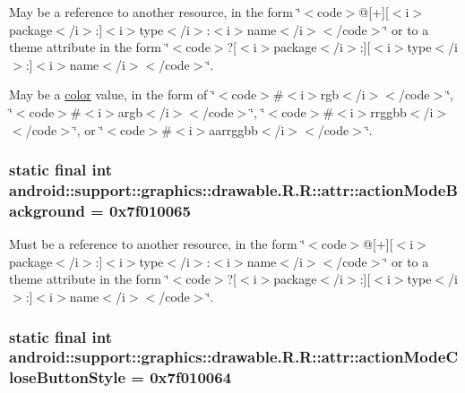 May be a reference to another resource, in the form \char`\"{}$<$code$>$@\mbox{[}+\mbox{]}\mbox{[}$<$i$>$package$<$/i$>$:\mbox{]}$<$i$>$type$<$/i$>$:$<$i$>$name$<$/i$>$$<$/code$>$\char`\"{} or to a theme attribute in the form \char`\"{}$<$code$>$?\mbox{[}$<$i$>$package$<$/i$>$:\mbox{]}\mbox{[}$<$i$>$type$<$/i$>$:\mbox{]}$<$i$>$name$<$/i$>$$<$/code$>$\char`\"{}. 

May be a \hyperlink{classandroid_1_1support_1_1graphics_1_1drawable_1_1_r_1_1color}{color} value, in the form of \char`\"{}$<$code$>$\#$<$i$>$rgb$<$/i$>$$<$/code$>$\char`\"{}, \char`\"{}$<$code$>$\#$<$i$>$argb$<$/i$>$$<$/code$>$\char`\"{}, \char`\"{}$<$code$>$\#$<$i$>$rrggbb$<$/i$>$$<$/code$>$\char`\"{}, or \char`\"{}$<$code$>$\#$<$i$>$aarrggbb$<$/i$>$$<$/code$>$\char`\"{}. \hypertarget{classandroid_1_1support_1_1graphics_1_1drawable_1_1_r_1_1attr_667e70303062dddc554fcef0ce17caef}{
\subsubsection[{actionModeBackground}]{\setlength{\rightskip}{0pt plus 5cm}static final int android::support::graphics::drawable.R.R::attr::actionModeBackground = 0x7f010065}}
\label{classandroid_1_1support_1_1graphics_1_1drawable_1_1_r_1_1attr_667e70303062dddc554fcef0ce17caef}


Must be a reference to another resource, in the form \char`\"{}$<$code$>$@\mbox{[}+\mbox{]}\mbox{[}$<$i$>$package$<$/i$>$:\mbox{]}$<$i$>$type$<$/i$>$:$<$i$>$name$<$/i$>$$<$/code$>$\char`\"{} or to a theme attribute in the form \char`\"{}$<$code$>$?\mbox{[}$<$i$>$package$<$/i$>$:\mbox{]}\mbox{[}$<$i$>$type$<$/i$>$:\mbox{]}$<$i$>$name$<$/i$>$$<$/code$>$\char`\"{}. \hypertarget{classandroid_1_1support_1_1graphics_1_1drawable_1_1_r_1_1attr_730564cfa97524acbcc51f6886fa1c5e}{
\subsubsection[{actionModeCloseButtonStyle}]{\setlength{\rightskip}{0pt plus 5cm}static final int android::support::graphics::drawable.R.R::attr::actionModeCloseButtonStyle = 0x7f010064}}
\label{classandroid_1_1support_1_1graphics_1_1drawable_1_1_r_1_1attr_730564cfa97524acbcc51f6886fa1c5e}


